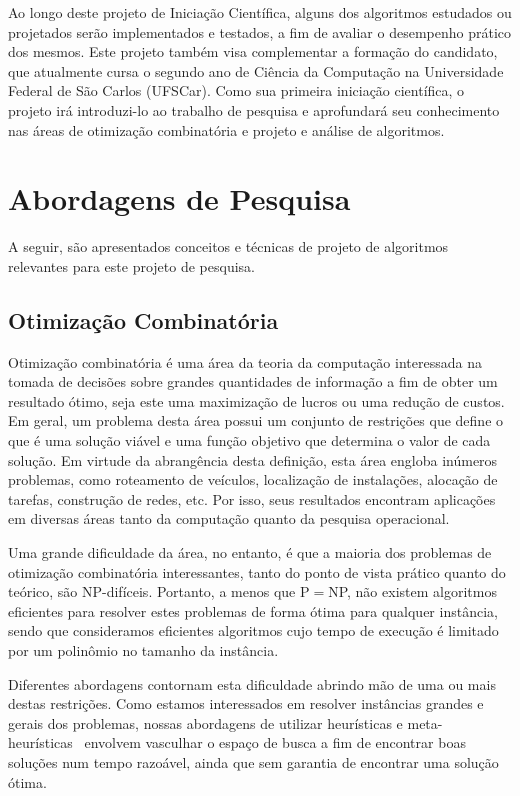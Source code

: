 \documentclass[12pt,a4paper]{article}
\begin{document}
Ao longo deste projeto de Iniciação Científica, alguns dos algoritmos estudados ou projetados serão implementados e testados, a fim de avaliar o desempenho prático dos mesmos. Este projeto também visa complementar a formação do candidato, que atualmente cursa o segundo ano de Ciência da Computação na Universidade Federal de São Carlos (UFSCar). Como sua primeira iniciação científica, o projeto irá introduzi-lo ao trabalho de pesquisa e aprofundará seu conhecimento nas áreas de otimização combinatória e projeto e análise de algoritmos.


\section{Abordagens de Pesquisa}

A seguir, são apresentados conceitos e técnicas de projeto de algoritmos relevantes para este projeto de pesquisa.



\subsection{Otimização Combinatória}

Otimização combinatória é uma área da teoria da computação interessada na tomada de decisões sobre grandes quantidades de informação a fim de obter um resultado ótimo, seja este uma maximização de lucros ou uma redução de custos.
Em geral, um problema desta área possui um conjunto de restrições que define o que é uma solução viável e uma função objetivo que determina o valor de cada solução.
Em virtude da abrangência desta definição, esta área engloba inúmeros problemas, como roteamento de veículos, localização de instalações, alocação de tarefas, construção de redes, etc.
Por isso, seus resultados encontram aplicações em diversas áreas tanto da computação quanto da pesquisa operacional.

Uma grande dificuldade da área, no entanto, é que a maioria dos problemas de otimização combinatória interessantes, tanto do ponto de vista prático quanto do teórico, são NP-difíceis.
Portanto, a menos que P$=$NP, não existem algoritmos eficientes para resolver estes problemas de forma ótima para qualquer instância, sendo que consideramos eficientes algoritmos cujo tempo de execução é limitado por um polinômio no tamanho da instância.

Diferentes abordagens contornam esta dificuldade abrindo mão de uma ou mais destas restrições.
Como estamos interessados em resolver instâncias grandes e gerais dos problemas, nossas abordagens de utilizar heurísticas e meta-heurísticas~\cite{glover2006handbook,talbi2009metaheuristics} envolvem vasculhar o espaço de busca a fim de encontrar boas soluções num tempo razoável, ainda que sem garantia de encontrar uma solução ótima.
\end{document}
